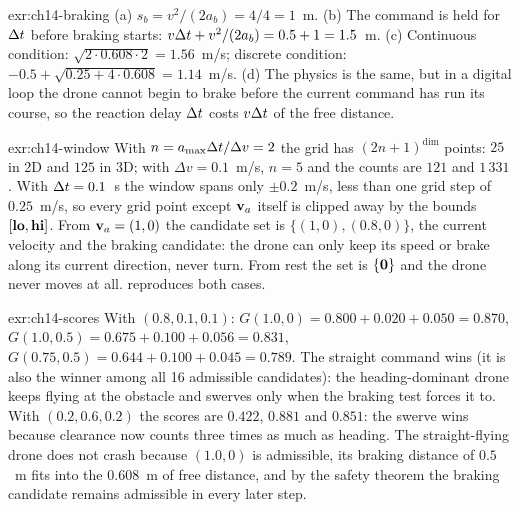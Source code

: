 \begin{solution}{exr:ch14-braking}
(a) $s_b = v^2/(2a_b) = 4/4 = 1$~m. (b) The command is held for $\Delta t$ before braking starts: $v\Delta t + v^2/(2a_b) = 0.5 + 1 = 1.5$~m. (c) Continuous condition: $\sqrt{2 \cdot 0.608 \cdot 2} = 1.56$~m/s; discrete condition: $-0.5 + \sqrt{0.25 + 4 \cdot 0.608} = 1.14$~m/s. (d) The physics is the same, but in a digital loop the drone cannot begin to brake before the current command has run its course, so the reaction delay $\Delta t$ costs $v\Delta t$ of the free distance.
\end{solution}
\begin{solution}{exr:ch14-window}
With $n = a_{\max}\Delta t/\Delta v = 2$ the grid has $(2n+1)^{\dim}$ points: $25$ in 2D and $125$ in 3D; with $\Delta v = 0.1$~m/s, $n = 5$ and the counts are $121$ and $1\,331$. With $\Delta t = 0.1$~s the window spans only $\pm 0.2$~m/s, less than one grid step of $0.25$~m/s, so every grid point except $\mathbf{v}_a$ itself is clipped away by the bounds $[\mathbf{lo}, \mathbf{hi}]$. From $\mathbf{v}_a = (1, 0)$ the candidate set is $\{(1, 0), (0.8, 0)\}$, the current velocity and the braking candidate: the drone can only keep its speed or brake along its current direction, never turn. From rest the set is $\{\mathbf{0}\}$ and the drone never moves at all.  reproduces both cases.
\end{solution}
\begin{solution}{exr:ch14-scores}
With $(0.8, 0.1, 0.1)$: $G(1.0, 0) = 0.800 + 0.020 + 0.050 = 0.870$, $G(1.0, 0.5) = 0.675 + 0.100 + 0.056 = 0.831$, $G(0.75, 0.5) = 0.644 + 0.100 + 0.045 = 0.789$. The straight command wins (it is also the winner among all 16 admissible candidates): the heading-dominant drone keeps flying at the obstacle and swerves only when the braking test forces it to. With $(0.2, 0.6, 0.2)$ the scores are $0.422$, $0.881$ and $0.851$: the swerve wins because clearance now counts three times as much as heading. The straight-flying drone does not crash because $(1.0, 0)$ is admissible, its braking distance of $0.5$~m fits into the $0.608$~m of free distance, and by the safety theorem the braking candidate remains admissible in every later step.
\end{solution}
